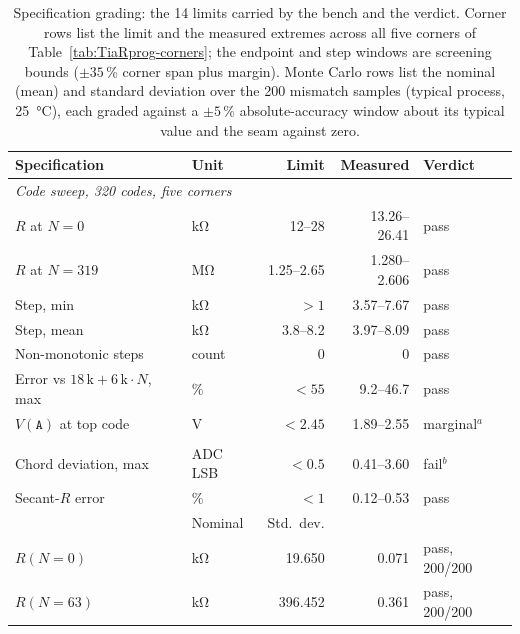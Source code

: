 \begin{table}[htbp]
  \centering
  \caption[{Specification grading of the programmable feedback resistor: 14
  simulator-graded limits.}]{Specification grading: the 14 limits carried by
  the bench and the verdict. Corner rows list the limit and the measured
  extremes across all five corners of Table~\ref{tab:TiaRprog-corners}; the
  endpoint and step windows are screening bounds (\(\pm 35\,\%\) corner span
  plus margin). Monte Carlo rows list the nominal (mean) and standard
  deviation over the 200 mismatch samples (typical process,
  \SI{25}{\celsius}), each graded against a \(\pm 5\,\%\) absolute-accuracy
  window about its typical value and the seam against zero.}
  \label{tab:tiarprog-spec}
  \small
  \begin{tabular}{llrrl}
    \toprule
    Specification & Unit & Limit & Measured & Verdict \\
    \midrule
    \multicolumn{5}{l}{\emph{Code sweep, 320 codes, five corners}} \\
    $R$ at $N{=}0$ & \si{\kilo\ohm} & 12--28 & 13.26--26.41 & pass \\
    $R$ at $N{=}319$ & \si{\mega\ohm} & 1.25--2.65 & 1.280--2.606 & pass \\
    Step, min & \si{\kilo\ohm} & $>1$ & 3.57--7.67 & pass \\
    Step, mean & \si{\kilo\ohm} & 3.8--8.2 & 3.97--8.09 & pass \\
    Non-monotonic steps & count & 0 & 0 & pass \\
    Error vs $18\,\mathrm{k}+6\,\mathrm{k}\cdot N$, max & \si{\percent} & $<55$ & 9.2--46.7 & pass \\
    $V(\mathtt{A})$ at top code & \si{\volt} & $<2.45$ & 1.89--2.55 & marginal$^{a}$ \\
    \addlinespace
    \multicolumn{5}{l}{\emph{Drive linearity at $N{=}0$, five corners}} \\
    Chord deviation, max & ADC LSB & $<0.5$ & 0.41--3.60 & fail$^{b}$ \\
    Secant-$R$ error & \si{\percent} & $<1$ & 0.12--0.53 & pass \\
    \addlinespace
    \multicolumn{2}{l}{\emph{Monte Carlo, 200 mismatch samples, typical}}
      & Nominal & Std.\ dev. & \\
    $R(N{=}0)$ & \si{\kilo\ohm} & 19.650 & 0.071 & pass, 200/200 \\
    $R(N{=}63)$ & \si{\kilo\ohm} & 396.452 & 0.361 & pass, 200/200 \\

\end{tabular}
\end{table}
